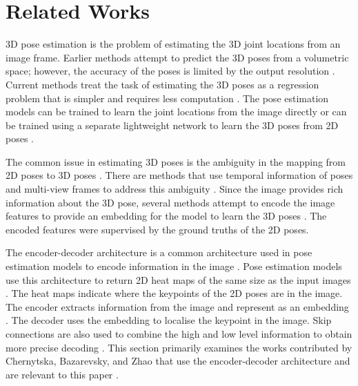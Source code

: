 \section{Related Works}
\noindent
3D pose estimation is the problem of estimating the 3D joint locations from an image frame. Earlier methods attempt to predict the 3D poses from a volumetric space; however, the accuracy  of the poses is limited by the output resolution \cite{poseestimationreview}. Current methods treat the task of estimating the 3D poses as a regression problem that is simpler and requires less computation \cite{poseestimationreview}. The pose estimation models can be trained to learn the joint locations from the image directly or can be trained using a separate lightweight network to learn the 3D poses from 2D poses \cite{baseline, poseestimationreview}. 

\noindent
The common issue in estimating 3D poses is the ambiguity in the mapping from 2D poses to 3D poses \cite{poseestimationreview}. There are methods that use temporal information of poses and multi-view frames to address this ambiguity \cite{poseestimationreview}. Since the image provides rich information about the 3D pose, several methods attempt to encode the image features to provide an embedding for the model to learn the 3D poses \cite{blazepose, handgcn, olha}. The encoded features were supervised by the ground truths of the 2D poses.

\noindent
The encoder-decoder architecture is a common architecture used in pose estimation models to encode information in the image \cite{olha}. Pose estimation models use this architecture to return 2D heat maps of the same size as the input images \cite{olha}. The heat maps indicate where the keypoints of the 2D poses are in the image. The encoder extracts information from the image and represent as an embedding \cite{blazepose}. The decoder uses the embedding to localise the keypoint in the image. Skip connections are also used to combine the high and low level information to obtain more precise decoding \cite{olha, blazepose}. This section primarily examines the works contributed by Chernytska, Bazarevsky, and Zhao that use the encoder-decoder architecture and are relevant to this paper \cite{blazepose, handgcn, olha}.

